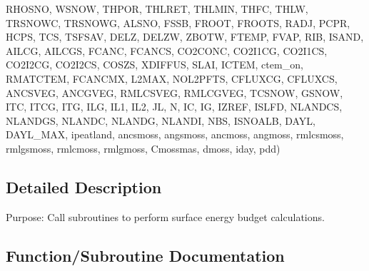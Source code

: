 \begin{DoxyCompactItemize}
R\+H\+O\+S\+N\+O, W\+S\+N\+O\+W, T\+H\+P\+O\+R, T\+H\+L\+R\+E\+T, T\+H\+L\+M\+I\+N, T\+H\+F\+C, T\+H\+L\+W, T\+R\+S\+N\+O\+W\+C, T\+R\+S\+N\+O\+W\+G, A\+L\+S\+N\+O, F\+S\+S\+B, F\+R\+O\+O\+T, F\+R\+O\+O\+T\+S, R\+A\+D\+J, P\+C\+P\+R, H\+C\+P\+S, T\+C\+S, T\+S\+F\+S\+A\+V, D\+E\+L\+Z, D\+E\+L\+Z\+W, Z\+B\+O\+T\+W, F\+T\+E\+M\+P, F\+V\+A\+P, R\+I\+B, I\+S\+A\+N\+D, A\+I\+L\+C\+G, A\+I\+L\+C\+G\+S, F\+C\+A\+N\+C, F\+C\+A\+N\+C\+S, C\+O2\+C\+O\+N\+C, C\+O2\+I1\+C\+G, C\+O2\+I1\+C\+S, C\+O2\+I2\+C\+G, C\+O2\+I2\+C\+S, C\+O\+S\+Z\+S, X\+D\+I\+F\+F\+U\+S, S\+L\+A\+I, I\+C\+T\+E\+M, ctem\+\_\+on, R\+M\+A\+T\+C\+T\+E\+M, F\+C\+A\+N\+C\+M\+X, L2\+M\+A\+X, N\+O\+L2\+P\+F\+T\+S, C\+F\+L\+U\+X\+C\+G, C\+F\+L\+U\+X\+C\+S, A\+N\+C\+S\+V\+E\+G, A\+N\+C\+G\+V\+E\+G, R\+M\+L\+C\+S\+V\+E\+G, R\+M\+L\+C\+G\+V\+E\+G, T\+C\+S\+N\+O\+W, G\+S\+N\+O\+W, I\+T\+C, I\+T\+C\+G, I\+T\+G, I\+L\+G, I\+L1, I\+L2, J\+L, N, I\+C, I\+G, I\+Z\+R\+E\+F, I\+S\+L\+F\+D, N\+L\+A\+N\+D\+C\+S, N\+L\+A\+N\+D\+G\+S, N\+L\+A\+N\+D\+C, N\+L\+A\+N\+D\+G, N\+L\+A\+N\+D\+I, N\+B\+S, I\+S\+N\+O\+A\+L\+B, D\+A\+Y\+L, D\+A\+Y\+L\+\_\+\+M\+A\+X, ipeatland, ancsmoss, angsmoss, ancmoss, angmoss, rmlcsmoss, rmlgsmoss, rmlcmoss, rmlgmoss, Cmossmas, dmoss, iday, pdd)
\end{DoxyCompactItemize}


\subsection{Detailed Description}
Purpose\+: Call subroutines to perform surface energy budget calculations. 



\subsection{Function/\+Subroutine Documentation}
\hypertarget{CLASST_8f_afc821376816034a0c657e69bb4b06a24}{}
